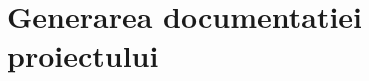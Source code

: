 \begin{comment}
\section{Rularea proiectului din STS, pe CloudFoundry (NERECOMANDAT)}

\paragraph{!!! ATENTIE !!!} 
Accesul la acest cont/server este shared (e folosit inclusiv de catre Jenkins), 
pot aparea suprapuneri nedorite intre variante diferite / dezvoltatori diferiti !!!

Se adauga in view-ul 'Servers' un nou server remote: click-dreapta -> 'New'
-> 'Server' -> vendor 'VMware' -> tip 'Cloud Foundry' -> 'Next'.

Se completeaza wizard-ul conform urmatorilor pasi:
\begin{itemize}
  \item 
Email: roda.devel@gmail.com
  \item 
Parola: RodaAdor
  \item 
'Validate Account'
  \item 
'Next'
  \item 
Se muta proiectul 'roda' din lista 'Available' in lista 'Configured'
  \item 
'Next'
  \item 
In fereastra 'Application details', se selecteaza 'Application Type' = 'Spring'
  \item 
'Next'
  \item 
'Deployed URL': roda.cloudfoundry.com
  \item 
'Memory Reservation': 2048 M
  \item 
'Next'
  \item 
Se bifeaza serviciul 'roda-postgres' (baza de date Postgresql) in lista
aparuta.
  \item 
'Finish'
\end{itemize}

Proiectul este disponibil online permanent la adresa:

\url{http://roda.cloudfoundry.com}

\end{comment}

\section{Generarea documentatiei proiectului}

